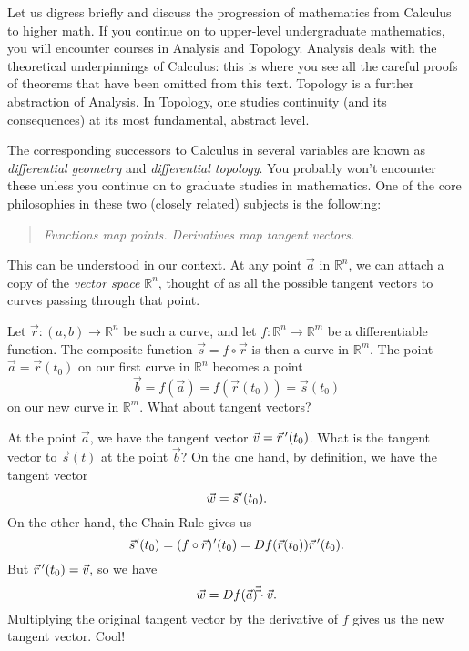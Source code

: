 Let us digress briefly and discuss the progression of mathematics from Calculus to higher math. If you continue on to upper-level undergraduate mathematics, you will encounter courses in Analysis and Topology. Analysis deals with the theoretical underpinnings of Calculus: this is where you see all the careful proofs of theorems that have been omitted from this text. Topology is a further abstraction of Analysis. In Topology, one studies continuity (and its consequences) at its most fundamental, abstract level.

The corresponding successors to Calculus in several variables are known as \emph{differential geometry} and \emph{differential topology}. You probably won't encounter these unless you continue on to graduate studies in mathematics. One of the core philosophies in these two (closely related) subjects is the following:

\begin{quote}
\emph{Functions map points. Derivatives map tangent vectors.}
\end{quote}

This can be understood in our context. At any point $\vec{a}$ in $\mathbb{R}^n$, we can attach a copy of the \emph{vector space} $\mathbb{R}^n$, thought of as all the possible tangent vectors to curves passing through that point.

Let $\vec{r}:(a,b)\to \mathbb{R}^n$ be such a curve, and let $f:\mathbb{R}^n\to \mathbb{R}^m$ be a differentiable function. The composite function $\vec{s}=f\circ \vec{r}$ is then a curve in $\mathbb{R}^m$. The point $\vec{a} = \vec{r}(t_0)$ on our first curve in $\mathbb{R}^n$ becomes a point 
\[
\vec{b} = f(\vec{a}) = f(\vec{r}(t_0)) = \vec{s}(t_0)
\]
on our new curve in $\mathbb{R}^m$. What about tangent vectors?

At the point $\vec{a}$, we have the tangent vector $\vec{v} = \vec r\, '(t_0)$. What is the tangent vector to $\vec{s}(t)$ at the point $\vec{b}$? On the one hand, by definition, we have the tangent vector
\[
\vec{w} = \vec{s}\hskip.75pt ' (t_0).
\]
On the other hand, the Chain Rule gives us
\[
\vec{s}\hskip.75pt ' (t_0) = (f\circ \vec{r})\hskip.75pt '(t_0) = Df(\vec{r}(t_0))\vec r\, '(t_0).
\]
But $\vec r\, '(t_0)=\vec{v}$, so we have
\[
\vec{w} = Df(\vec{a})\vec \vec \cdot \vec v.
\]
Multiplying the original tangent vector by the derivative of $f$ gives us the new tangent vector. Cool!

